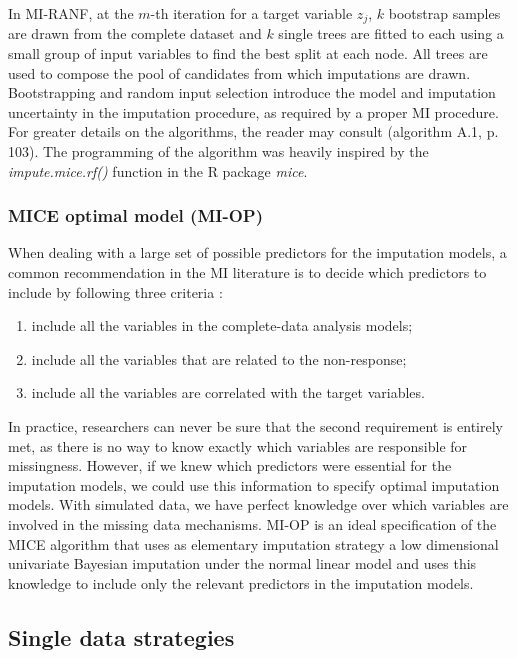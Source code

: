 	In MI-RANF, at the $m$-th iteration for a target variable $z_j$, $k$ bootstrap samples are drawn from the complete 
	dataset and $k$ single trees are fitted to each using a small group of input variables to find the best split at each node.
	All trees are used to compose the pool of candidates from which imputations are drawn.
	Bootstrapping and random input selection introduce the model and imputation uncertainty in the imputation procedure,
	as required by a proper MI procedure.
	For greater details on the algorithms, the reader may consult \cite{dooveEtAl:2014} (algorithm A.1, p. 103).
	The programming of the algorithm was heavily inspired by the \emph{impute.mice.rf()} function in the 
	R package \emph{mice}.

\subsubsection{MICE optimal model (MI-OP)}
	When dealing with a large set of possible predictors for the imputation models, a common recommendation in the MI 
	literature is to decide which predictors to include by following three criteria \citep[p. 168]{vanBuuren:2012}:
	\begin{enumerate}

	\item include all the variables in the complete-data analysis models;
	\item include all the variables that are related to the non-response;
	\item include all the variables are correlated with the target variables.

	\end{enumerate}

	In practice, researchers can never be sure that the second requirement is entirely met, as there is no way to know exactly 
	which variables are responsible for missingness.
	However, if we knew which predictors were essential for the imputation models, we could use this information to specify 
	optimal imputation models.
	With simulated data, we have perfect knowledge over which variables are involved in the missing data mechanisms.
	MI-OP is an ideal specification of the MICE algorithm that uses as elementary imputation strategy a low dimensional 
	univariate Bayesian imputation under the normal linear model and uses this knowledge to include only the relevant 
	predictors in the imputation models.
	
\subsection{Single data strategies}

